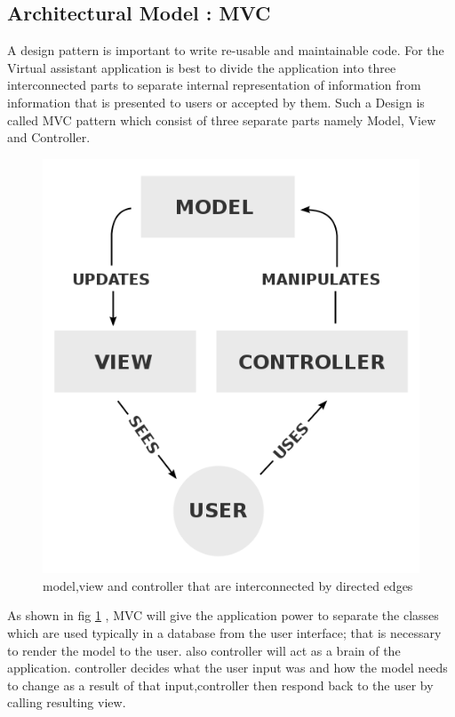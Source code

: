 \subsection{Architectural Model : MVC}
A design pattern is important to write re-usable and maintainable code. For the Virtual assistant application is best to divide the application into three interconnected parts to separate internal representation of information from information that is presented to users or accepted by them\cite{wiki:mvc}. Such a Design is called MVC pattern which consist of three separate parts namely Model, View and Controller.
\begin{figure}[h]
\centering
\includegraphics[scale=0.3]{./img/MVC.png}
\caption{\small{model,view and controller that are interconnected by directed edges}}
\label{mvc}
	
\end{figure}

As shown in fig \ref{mvc} , MVC will give the application power to separate the classes which are used typically in a database from the user interface; that is necessary to render the model to the user. also controller will act as a brain of the application. controller decides what the user input was and how the model needs to change as a result of that input\cite{codinghorror},controller then respond back to the user by calling resulting view.

